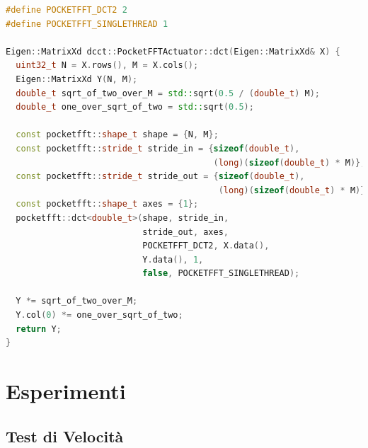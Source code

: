 \documentclass[a4paper,11pt,oneside, table]{article}
\begin{document}
\begin{lstlisting}[language=C++]
#define POCKETFFT_DCT2 2
#define POCKETFFT_SINGLETHREAD 1

Eigen::MatrixXd dcct::PocketFFTActuator::dct(Eigen::MatrixXd& X) {
  uint32_t N = X.rows(), M = X.cols();
  Eigen::MatrixXd Y(N, M);
  double_t sqrt_of_two_over_M = std::sqrt(0.5 / (double_t) M);
  double_t one_over_sqrt_of_two = std::sqrt(0.5);

  const pocketfft::shape_t shape = {N, M};
  const pocketfft::stride_t stride_in = {sizeof(double_t),
                                         (long)(sizeof(double_t) * M)};
  const pocketfft::stride_t stride_out = {sizeof(double_t),
                                          (long)(sizeof(double_t) * M)};
  const pocketfft::shape_t axes = {1};
  pocketfft::dct<double_t>(shape, stride_in,
                           stride_out, axes,
                           POCKETFFT_DCT2, X.data(),
                           Y.data(), 1,
                           false, POCKETFFT_SINGLETHREAD);

  Y *= sqrt_of_two_over_M;
  Y.col(0) *= one_over_sqrt_of_two;
  return Y;
}
\end{lstlisting}


\section{Esperimenti}


\subsection{Test di Velocit\`a}

\end{document}
